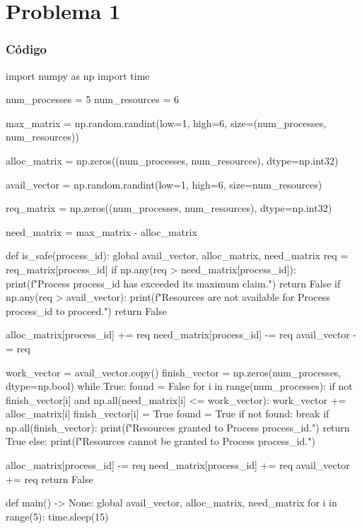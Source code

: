 \chapter{Problema 1}

\subsection*{Código}

\begin{python}
import numpy as np
import time

num_processes = 5
num_resources = 6

max_matrix = np.random.randint(low=1, high=6, size=(num_processes, num_resources))

alloc_matrix = np.zeros((num_processes, num_resources), dtype=np.int32)

avail_vector = np.random.randint(low=1, high=6, size=num_resources)

req_matrix = np.zeros((num_processes, num_resources), dtype=np.int32)

need_matrix = max_matrix - alloc_matrix

def is_safe(process_id):
    global avail_vector, alloc_matrix, need_matrix
    req = req_matrix[process_id]
    if np.any(req > need_matrix[process_id]):
        print(f"Process {process_id} has exceeded its maximum claim.")
        return False
    if np.any(req > avail_vector):
        print(f"Resources are not available for Process {process_id} to proceed.")
        return False

    alloc_matrix[process_id] += req
    need_matrix[process_id] -= req
    avail_vector -= req

    work_vector = avail_vector.copy()
    finish_vector = np.zeros(num_processes, dtype=np.bool)
    while True:
        found = False
        for i in range(num_processes):
            if not finish_vector[i] and np.all(need_matrix[i] <= work_vector):
                work_vector += alloc_matrix[i]
                finish_vector[i] = True
                found = True
        if not found:
            break
    if np.all(finish_vector):
        print(f"Resources granted to Process {process_id}.")
        return True
    else:
        print(f"Resources cannot be granted to Process {process_id}.")

        alloc_matrix[process_id] -= req
        need_matrix[process_id] += req
        avail_vector += req
        return False

def main() -> None:
    global avail_vector, alloc_matrix, need_matrix
    for i in range(5):
        time.sleep(15)


\end{python}
